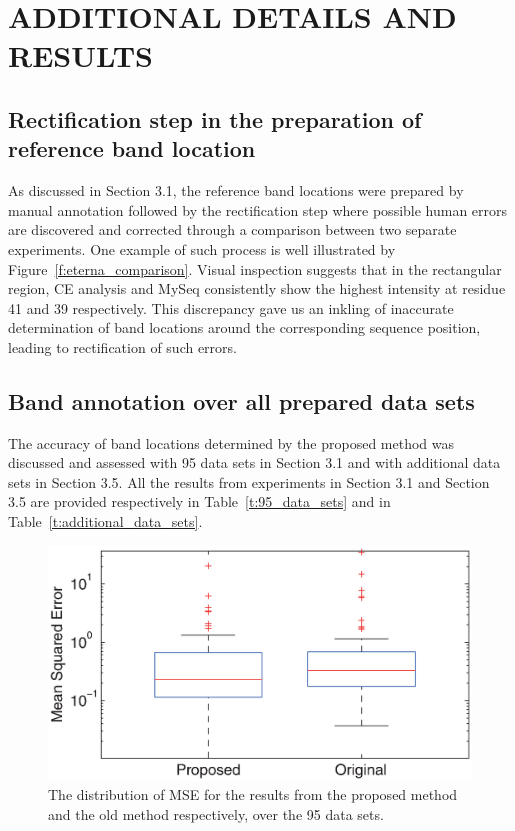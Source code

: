 \documentclass[letter]{bioinfo}
\begin{document}
\section{ADDITIONAL DETAILS AND RESULTS}

\subsection{ Rectification step in the preparation of reference band location }
As discussed in Section 3.1, the reference band locations were prepared by manual annotation followed by the rectification step where possible human errors are discovered and corrected through a comparison between two separate experiments. One example of such process is well illustrated by Figure~\ref{f:eterna_comparison}. Visual inspection suggests that in the rectangular region, CE analysis and MySeq consistently show the highest intensity at residue 41 and 39 respectively. This discrepancy gave us an inkling of inaccurate determination of band locations around the corresponding sequence position, leading to rectification of such errors.


\subsection{ Band annotation over all prepared data sets }
The accuracy of band locations determined by the proposed method was discussed and assessed with 95 data sets in Section 3.1 and with additional data sets in Section 3.5. All the results from experiments in Section 3.1 and Section 3.5 are provided respectively in Table~\ref{t:95_data_sets} and in Table~\ref{t:additional_data_sets}.



\begin{figure}
\centering
\includegraphics[width=\linewidth]{figures/supp_old_new_comparison}
\caption{The distribution of MSE for the results from the proposed method and the old method respectively, over the 95 data sets.}
\label{f:old_vs_new}
\end{figure}
\end{document}
